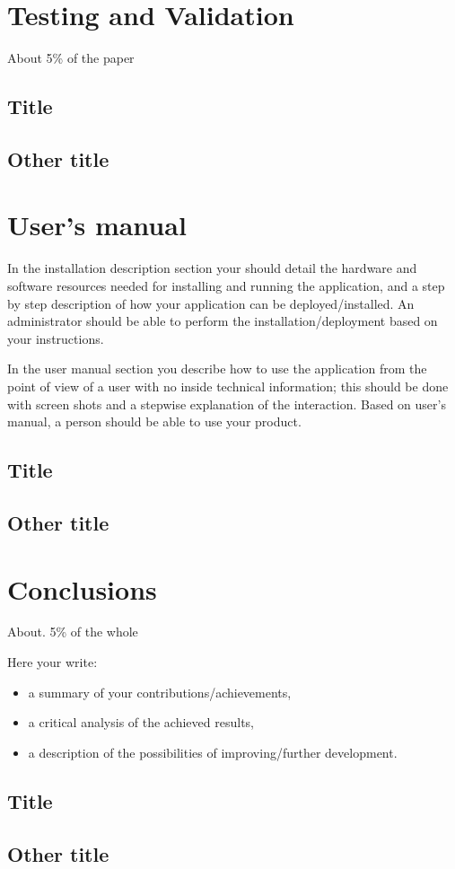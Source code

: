 \documentclass[12pt,a4paper,twoside]{report}
\begin{document}


\chapter{Testing and Validation}

About 5\% of the paper
\section{Title}
\section{Other title}

\chapter{User's manual}

In the installation description section your should detail the hardware and software resources needed for installing and running the application, and a step by step description of how your application can be deployed/installed. An administrator should be able to perform the installation/deployment based on your instructions.

In the user manual section you describe how to use the application from the point of view of a user with no inside technical information; this should be done with screen shots and a stepwise explanation of the interaction. Based on user's manual, a person should be able to use your product.

\section{Title}
\section{Other title}

\chapter{Conclusions}

About. 5\% of the whole

Here your write:
\begin{itemize}
\item a summary of your contributions/achievements,
\item a critical analysis of the achieved results,
\item a description of the possibilities of improving/further development.
\end{itemize}
\section{Title}
\section{Other title}


 


\end{document}
